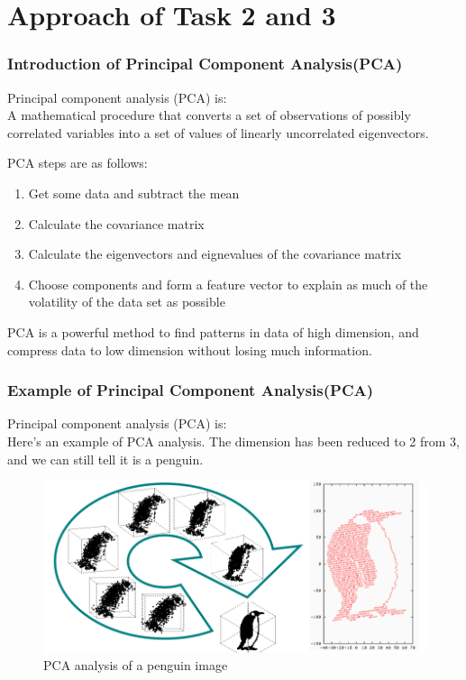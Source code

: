 \documentclass[compress,handout,10pt]{beamer}
\let\olditem\item
\renewcommand{\item}{\setlength{\itemsep}{0.5\baselineskip}\olditem}
\begin{document}
\section{Approach of Task 2 and 3}
\begin{frame}
    \frametitle{Introduction of Principal Component Analysis(PCA)}
Principal component analysis (PCA) is:\\
A mathematical procedure that converts a set of observations of possibly correlated variables into a set of values of linearly uncorrelated eigenvectors. 

PCA steps are as follows:
	\begin{enumerate}
	\item Get some data and subtract the mean
	\item Calculate the covariance matrix 
	\item Calculate the eigenvectors and eignevalues of the covariance matrix
	\item Choose components and form a feature vector to explain as much of the volatility of the data set as possible
	\end{enumerate}

\color{red} PCA is a powerful method to find patterns in data of high dimension, and compress data to low dimension without losing much information.
\end{frame}

\begin{frame}
    \frametitle{Example of Principal Component Analysis(PCA)}
Principal component analysis (PCA) is:\\
Here's an example of PCA analysis. 
The dimension has been reduced to 2 from 3, and we can still tell it is a penguin.
\begin{figure}[h]
\begin{center}
\includegraphics[width=\textwidth]{images/8.png}
\end{center}
\caption{PCA analysis of a penguin image}
\label{fig:penguin}
\end{figure}
\end{frame}
\end{document}

